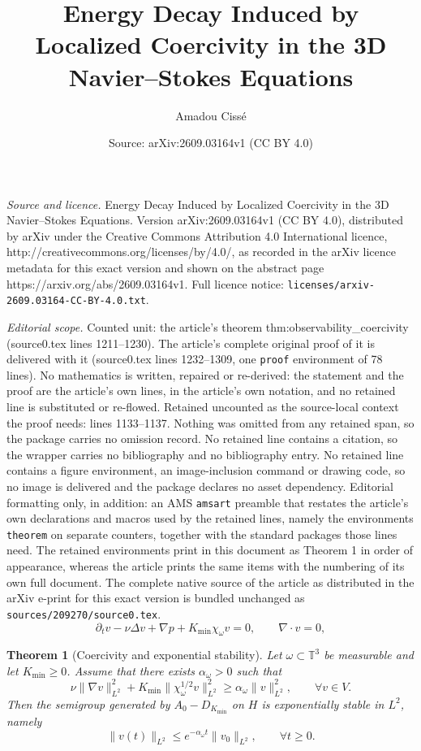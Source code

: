 \documentclass[10pt,a4paper]{amsart}
\title{Energy Decay Induced by Localized Coercivity in the 3D Navier--Stokes Equations}
\author{Amadou Ciss\'e}
\date{Source: arXiv:2609.03164v1 (CC BY 4.0)}
\newtheorem{theorem}{Theorem}
\begin{document}
\maketitle

\noindent\emph{Source and licence.} Energy Decay Induced by Localized Coercivity in the 3D Navier--Stokes Equations. Version arXiv:2609.03164v1 (CC BY 4.0), distributed by arXiv under the Creative Commons Attribution 4.0 International licence, http://creativecommons.org/licenses/by/4.0/, as recorded in the arXiv licence metadata for this exact version and shown on the abstract page https://arxiv.org/abs/2609.03164v1. Full licence notice: \texttt{licenses/arxiv-2609.03164-CC-BY-4.0.txt}.\par\smallskip

\noindent\textit{Editorial scope.} Counted unit: the article's theorem thm:observability\_coercivity (source0.tex lines 1211--1230). The article's complete original proof of it is delivered with it (source0.tex lines 1232--1309, one \texttt{proof} environment of 78 lines). No mathematics is written, repaired or re-derived: the statement and the proof are the article's own lines, in the article's own notation, and no retained line is substituted or re-flowed.  Retained uncounted as the source-local context the proof needs: lines 1133--1137.  Nothing was omitted from any retained span, so the package carries no omission record.  No retained line contains a citation, so the wrapper carries no bibliography and no bibliography entry.  No retained line contains a figure environment, an image-inclusion command or drawing code, so no image is delivered and the package declares no asset dependency.  Editorial formatting only, in addition: an AMS \texttt{amsart} preamble that restates the article's own declarations and macros used by the retained lines, namely the environments \texttt{theorem} on separate counters, together with the standard packages those lines need.  The retained environments print in this document as Theorem 1 in order of appearance, whereas the article prints the same items with the numbering of its own full document.  The complete native source of the article as distributed in the arXiv e-print for this exact version is bundled unchanged as \texttt{sources/209270/source0.tex}.
\begin{equation}
\label{eq:stokes_damped}
\partial_t v - \nu \Delta v + \nabla p + K_{\min}\chi_\omega v = 0,
\qquad \nabla\cdot v = 0,
\end{equation}

\begin{theorem}[Coercivity and exponential stability]
\label{thm:observability_coercivity}
Let $\omega\subset\mathbb{T}^3$ be measurable and let $K_{\min}\ge 0$.
Assume that there exists $\alpha_\omega>0$ such that
\begin{equation}
\label{eq:coercivity_obs}
\nu\|\nabla v\|_{L^2}^2
+
K_{\min}\|\chi_\omega^{1/2}v\|_{L^2}^2
\ge
\alpha_\omega\|v\|_{L^2}^2,
\qquad \forall v\in V.
\end{equation}
Then the semigroup generated by $A_0-D_{K_{\min}}$ on $H$ is exponentially
stable in $L^2$, namely
\[
\|v(t)\|_{L^2}\le e^{-\alpha_\omega t}\|v_0\|_{L^2},
\qquad \forall t\ge0.
\]
\end{theorem}
\end{document}
